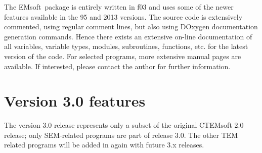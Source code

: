 \documentclass[DIV=calc, paper=letter, fontsize=11pt]{scrartcl}	 %
\newcommand{\ctp}{\textsf{EMsoft}}
\begin{document}
The \ctp\ package is entirely written in f03 and uses some of the newer features available in the 95 and 2013 versions.
The source code is extensively commented, using regular comment lines, but also using DOxygen documentation generation commands.  Hence
there exists an extensive on-line documentation of all variables, variable types, modules, subroutines, functions, etc. for the latest version 
of the code.  For selected programs, more extensive manual pages are available.  If interested, please contact the author for further information.

%

\newpage
\section{Version 3.0 features}
The version 3.0 release represents only a subset of the original CTEMsoft 2.0 release; only SEM-related programs are part of release 3.0.  The other TEM related programs 
will be added in again with future 3.x releases.
\end{document}

